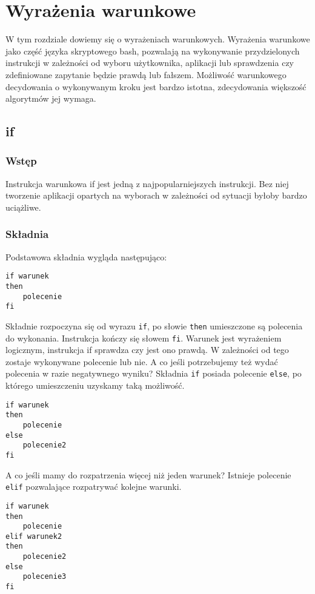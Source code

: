 \chapter{Wyrażenia warunkowe}
W tym rozdziale dowiemy się o wyrażeniach warunkowych. Wyrażenia warunkowe jako część języka skryptowego bash, pozwalają na wykonywanie przydzielonych instrukcji w zależności od wyboru użytkownika, aplikacji lub sprawdzenia czy zdefiniowane zapytanie będzie prawdą lub fałszem. Możliwość warunkowego decydowania o wykonywanym kroku jest bardzo istotna, zdecydowania większość algorytmów jej wymaga.
\section{if}
\subsection{Wstęp}
Instrukcja warunkowa if jest jedną z najpopularniejszych instrukcji. Bez niej tworzenie aplikacji opartych na wyborach w zależności od sytuacji byłoby bardzo uciążliwe.
\subsection{Składnia}
Podstawowa składnia wygląda następująco:
\begin{lstlisting}
if warunek
then
	polecenie
fi
\end{lstlisting}
Składnie rozpoczyna się od wyrazu \texttt{if}, po słowie \texttt{then} umieszczone są polecenia do wykonania. Instrukcja kończy się słowem \texttt{fi}. Warunek jest wyrażeniem logicznym, instrukcja if sprawdza czy jest ono prawdą. W zależności od tego zostaje wykonywane polecenie lub nie.\newline
A co jeśli potrzebujemy też wydać polecenia w razie negatywnego wyniku? Składnia \texttt{if} posiada polecenie \texttt{else}, po którego umieszczeniu uzyskamy taką możliwość.
\begin{lstlisting}
if warunek
then
	polecenie
else
	polecenie2
fi
\end{lstlisting}
A co jeśli mamy do rozpatrzenia więcej niż jeden warunek? Istnieje polecenie \texttt{elif} pozwalające rozpatrywać kolejne warunki.
\begin{lstlisting}
if warunek
then
	polecenie
elif warunek2
then
	polecenie2
else
	polecenie3
fi
\end{lstlisting}

